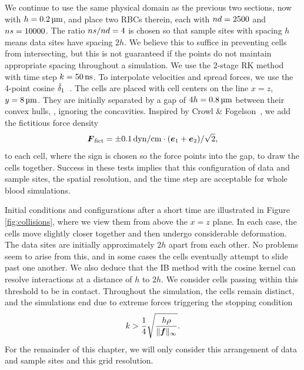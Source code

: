 We continue to use the same physical domain as the previous two sections, now with
$h = 0.2\um$, and place two RBCs therein, each with $\data\cardinality=2500$ and
$\sample\cardinality=10000$. The ratio $\sample\cardinality/\data\cardinality=4$ is
chosen so that sample sites with spacing $h$ means data sites have spacing $2h$. We
believe this to suffice in preventing cells from intersecting, but this is not guaranteed
if the points do not maintain appropriate spacing throughout a simulation. We use the
2-stage RK method with time step $\timestep = 50\ns$. To interpolate velocities and
spread forces, we use the 4-point cosine $\hat{\delta}_1$~\cite{Peskin:2002go}. The cells are
placed with cell centers on the line $x = z$, $y = 8\um$. They are initially separated by
a gap of $4h = 0.8\um$ between their convex hulls, , ignoring the
concavities. Inspired by Crowl \& Fogelson~\cite{Erickson:2011cf}, we add the fictitious
force density
\begin{equation*}
    \F_\text{fict} = \pm 0.1\dynpercm\cdot(\e_1+\e_2)/\sqrt{2},
\end{equation*}
to each cell, where the sign is chosen so the force points into the gap, to draw the
cells together. Success in these tests implies that this configuration of data and sample
sites, the spatial resolution, and the time step are acceptable for whole blood
simulations.

Initial conditions and configurations after a short time are illustrated in Figure~%
\ref{fig:collisions}, where we view them from above the $x=z$ plane. In each case, the
cells move slightly closer together and then undergo considerable deformation. The data
sites are initially approximately $2h$ apart from each other. No problems seem to arise
from this, and in some cases the cells eventually attempt to slide past one another.  We
also deduce that the IB method with the cosine kernel can resolve interactions at a
distance of $h$ to $2h$. We consider cells passing within this threshold to be in
contact. Throughout the simulation, the cells remain distinct, and the simulations end
due to extreme forces triggering the stopping condition~\cite{Agresar:1998wv}
\begin{equation}
    k > \frac14\sqrt{\frac{h\rho}{\|\boldsymbol{f}\|_\infty}}.
\end{equation}
For the remainder of this chapter, we will only consider this arrangement of data and
sample sites and this grid resolution.
